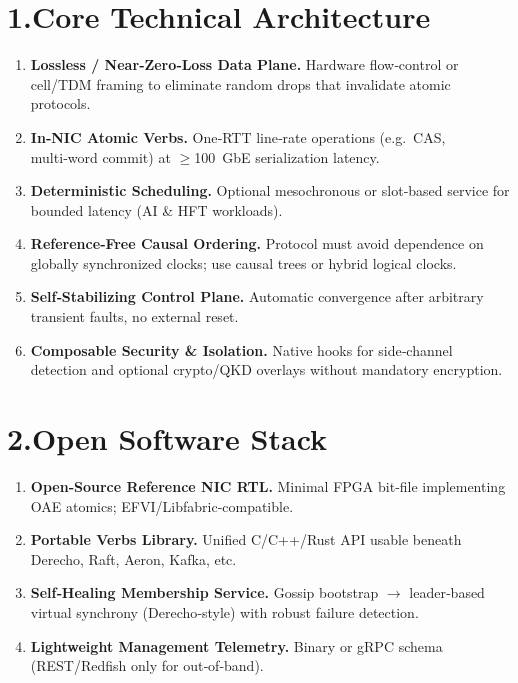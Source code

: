 \documentclass[HFT-main.tex]{subfiles}
\begin{document}
\section*{1.\quad Core Technical Architecture}
\begin{enumerate}
\item \textbf{Lossless / Near‑Zero‑Loss Data Plane.} Hardware flow‑control or cell/TDM framing to eliminate random drops that invalidate atomic protocols.
\item \textbf{In‑NIC Atomic Verbs.} One‑RTT line‑rate operations (e.g.\ CAS, multi‑word commit) at $\ge$100 GbE serialization latency.
\item \textbf{Deterministic Scheduling.} Optional mesochronous or slot‑based service for bounded latency (AI \& HFT workloads).
\item \textbf{Reference‑Free Causal Ordering.} Protocol must avoid dependence on globally synchronized clocks; use causal trees or hybrid logical clocks.
\item \textbf{Self‑Stabilizing Control Plane.} Automatic convergence after arbitrary transient faults, no external reset.
\item \textbf{Composable Security \& Isolation.} Native hooks for side‑channel detection and optional crypto/QKD overlays without mandatory encryption.
\end{enumerate}

\section*{2.\quad Open Software Stack}
\begin{enumerate}
\item \textbf{Open‑Source Reference NIC RTL.} Minimal FPGA bit‑file implementing OAE atomics; EFVI/Libfabric‑compatible.
\item \textbf{Portable Verbs Library.} Unified C/C++/Rust API usable beneath Derecho, Raft, Aeron, Kafka, etc.
\item \textbf{Self‑Healing Membership Service.} Gossip bootstrap $\rightarrow$ leader‑based virtual synchrony (Derecho‑style) with robust failure detection.
\item \textbf{Lightweight Management Telemetry.} Binary or gRPC schema (REST/Redfish only for out‑of‑band).
\end{enumerate}
\end{document}
